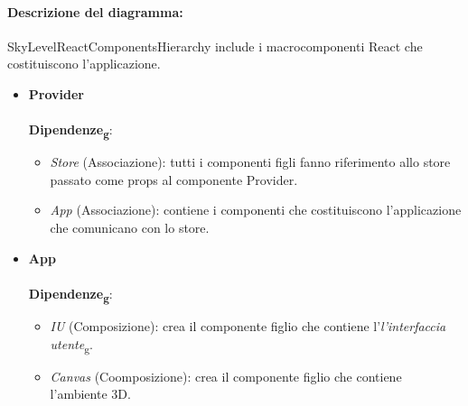 \paragraph*{Descrizione del diagramma:}
SkyLevelReactComponentsHierarchy include i macrocomponenti React che costituiscono l'applicazione.
\begin{itemize}
		\item \textbf{Provider}
		\\\\
		\textbf{Dipendenze\textsubscript{g}}:
		\begin{itemize}
			\item \textit{Store} (Associazione): tutti i componenti figli fanno riferimento allo store passato come props al 
			componente Provider.
			\item \textit{App} (Associazione): contiene i componenti che costituiscono l'applicazione che comunicano con lo store.
		\end{itemize}

		\item \textbf{App}
		\\\\
		\textbf{Dipendenze\textsubscript{g}}:
		\begin{itemize}
			\item \textit{IU} (Composizione): crea il componente figlio che contiene l'\textit{l'interfaccia 
		utente}\textsubscript{g}.
			\item \textit{Canvas} (Coomposizione): crea il componente figlio che contiene l'ambiente 3D.
		\end{itemize}
\end{itemize}

